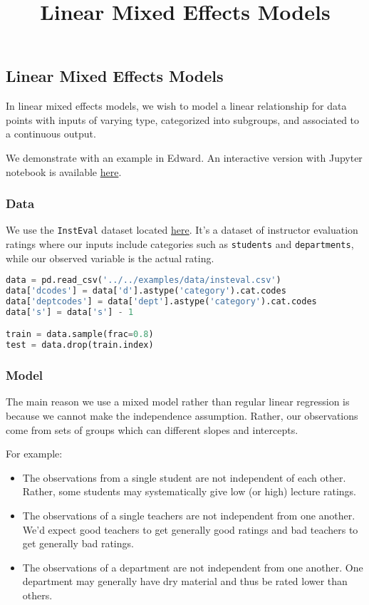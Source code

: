 \title{Linear Mixed Effects Models}

\subsection{Linear Mixed Effects Models}

In linear mixed effects models, we wish to model a linear relationship for data points with inputs of varying type, categorized into subgroups, and associated to a continuous output.

We demonstrate with an example in Edward.
An interactive version with Jupyter notebook is available
\href{http://nbviewer.jupyter.org/github/blei-lab/edward/blob/master/docs/notebooks/linear_mixed_effects_models.ipynb}{here}.

\subsubsection{Data}

We use the \texttt{InstEval} dataset located \href{https://github.com/blei-lab/edward/blob/master/examples/data/insteval.csv}{here}. It's a dataset of instructor evaluation ratings where our inputs include categories such as \texttt{students} and \texttt{departments}, while our observed variable is the actual rating.

\begin{lstlisting}[language=Python]
data = pd.read_csv('../../examples/data/insteval.csv')
data['dcodes'] = data['d'].astype('category').cat.codes
data['deptcodes'] = data['dept'].astype('category').cat.codes
data['s'] = data['s'] - 1

train = data.sample(frac=0.8)
test = data.drop(train.index)
\end{lstlisting}

\subsubsection{Model}

The main reason we use a mixed model rather than regular linear regression is because we cannot make the independence assumption. Rather, our observations come from sets of groups which can different slopes and intercepts.

For example:
\begin{itemize}
\item The observations from a single student are not independent of each other. Rather, some students may systematically give low (or high) lecture ratings.
\item The observations of a single teachers are not independent from one another. We'd expect good teachers to get generally good ratings and bad teachers to get generally bad ratings.
\item The observations of a department are not independent from one another. One department may generally have dry material and thus be rated lower than others.
\end{itemize}


